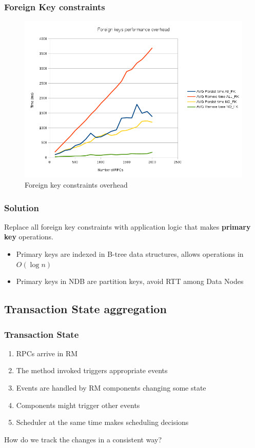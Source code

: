 \documentclass{beamer}
\begin{document}
\begin{frame}
\frametitle{Foreign Key constraints}
\begin{figure}
\centering
\includegraphics[scale=0.4]{resources/fk_overhead.png}
\caption{Foreign key constraints overhead}
\end{figure}
\end{frame}

\begin{frame}
\frametitle{Solution}
Replace all foreign key constraints with application logic that makes
\textbf{primary key} operations.

\begin{itemize}
\item<+-> Primary keys are indexed in B-tree data structures, allows
  operations in $O(\log{}n)$
\item<+-> Primary keys in NDB are partition keys, avoid RTT among Data
  Nodes
\end{itemize}
\end{frame}

\subsection{Transaction State aggregation}
\begin{frame}
\frametitle{Transaction State}

\begin{enumerate}
\item RPCs arrive in RM
\item The method invoked triggers appropriate events
\item Events are handled by RM components changing some state
\item Components might trigger other events
\item Scheduler at the same time makes scheduling decisions
\end{enumerate}

\pause
\vfill
\centering
{\color{red} How do we track the changes in a consistent way?}
\end{frame}
\end{document}
